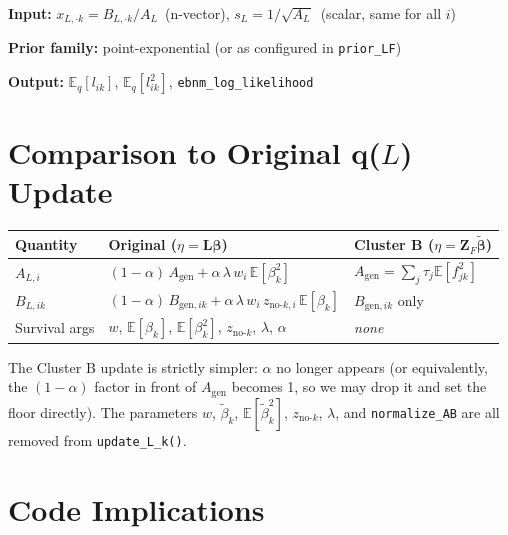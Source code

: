 \documentclass[11pt]{article}
\newcommand{\E}{\mathbb{E}}
\begin{document}
\begin{ebnmbox}
\textbf{Input:} \;
$x_{L,\cdot k} = B_{L,\cdot k} / A_{L}$ \,(n-vector),\;
$s_{L} = 1/\sqrt{A_{L}}$ \,(scalar, same for all $i$)

\vspace{6pt}
\textbf{Prior family:} point-exponential (or as configured in \texttt{prior\_LF})

\vspace{6pt}
\textbf{Output:} $\E_q[l_{ik}]$, $\E_q[l_{ik}^2]$, \texttt{ebnm\_log\_likelihood}
\end{ebnmbox}

\section{Comparison to Original q($L$) Update}

\begin{center}
\renewcommand{\arraystretch}{1.4}
\begin{tabular}{lll}
\hline
\textbf{Quantity} & \textbf{Original ($\eta = \mathbf{L}\boldsymbol{\beta}$)} & \textbf{Cluster B ($\eta = \mathbf{Z}_F\tilde{\boldsymbol{\beta}}$)} \\
\hline
$A_{L,i}$ & $(1-\alpha)\,A_{\text{gen}} + \alpha\,\lambda\,w_i\,\E[\beta_k^2]$ & $A_{\text{gen}} = \sum_j \tau_j\E[f_{jk}^2]$ \\
$B_{L,ik}$ & $(1-\alpha)\,B_{\text{gen},ik} + \alpha\,\lambda\,w_i\,z_{\text{no-}k,i}\,\E[\beta_k]$ & $B_{\text{gen},ik}$ only \\
Survival args & $w$, $\E[\beta_k]$, $\E[\beta_k^2]$, $z_{\text{no-}k}$, $\lambda$, $\alpha$ & \emph{none} \\
\hline
\end{tabular}
\end{center}

\bigskip
The Cluster B update is strictly simpler: $\alpha$ no longer appears (or equivalently,
the $(1-\alpha)$ factor in front of $A_{\text{gen}}$ becomes 1, so we may drop it and
set the floor directly). The parameters $w$, $\tilde{\beta}_k$,
$\E[\tilde{\beta}_k^2]$, $z_{\text{no-}k}$, $\lambda$, and \texttt{normalize\_AB}
are all removed from \texttt{update\_L\_k()}.

\section{Code Implications}
\end{document}

